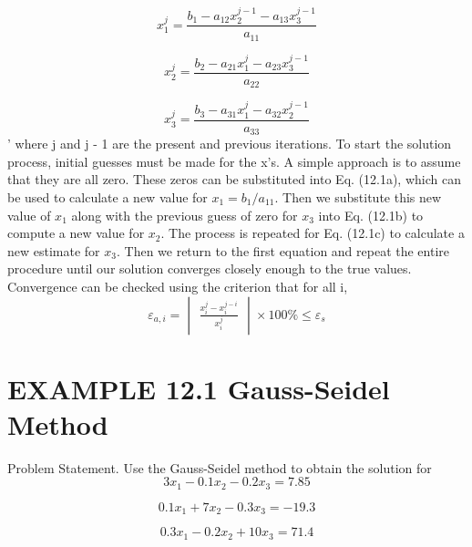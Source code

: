 \documentclass[../main.tex]{subfiles}
\begin{document}
\begin{equation}
x_{1}^{j}=\frac{b_{1}-a_{12}x_{2}^{j-1}-a_{13}x_{3}^{j-1}}{a_{11}}\tag{12.1a}
\end{equation}

\begin{equation}
x_{2}^{j}=\frac{b_{2}-a_{21}x_{1}^{j}-a_{23}x_{3}^{j-1}}{a_{22}}
\tag{12.1b}
\end{equation}

\begin{equation}
x_{3}^{j}=\frac{b_{3}-a_{31}x_{1}^{j}-a_{32}x_{2}^{j-1}}{a_{33}}
\tag{12.1c}
\end{equation}
'
where j and j - 1 are the present and previous iterations.
To start the solution process, initial guesses must be made for the x's. A simple approach is to assume that they are all zero. These zeros can be substituted into Eq. (12.1a),
which can be used to calculate a new value for $x_{1} = b_{1}/a_{11}$. Then we substitute this new
value of $x_{1}$ along with the previous guess of zero for $x_{3}$ into Eq. (12.1b) to compute a new
value for $x_{2}$. The process is repeated for Eq. (12.1c) to calculate a new estimate for $x_{3}$. Then
we return to the first equation and repeat the entire procedure until our solution converges
closely enough to the true values. Convergence can be checked using the criterion that for
all i,
\begin{equation}
\varepsilon _{a,i}=\begin{vmatrix}
\frac{x_{i}^{j}-x_{i}^{j-i}}{x_{i}^{j}}
\end{vmatrix}\times 100\%\leq \varepsilon_{s}
\end{equation}


\section*{EXAMPLE 12.1 Gauss-Seidel Method}

Problem Statement. Use the Gauss-Seidel method to obtain the solution for
\begin{equation}
3x_{1}-0.1x_{2}-0.2x_{3}=7.85
\end{equation}

\begin{equation}
0.1x_{1}+7x_{2}-0.3x_{3}=-19.3
\end{equation}

\begin{equation}
0.3x_{1}-0.2x_{2}+10x_{3}=71.4
\end{equation}
\end{document}
